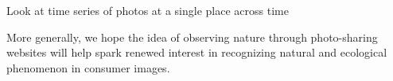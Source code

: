 Look at time series of photos at a single place across time 


More generally, we hope
the idea of observing nature through photo-sharing websites will help
spark renewed interest in recognizing natural and ecological phenomenon in
consumer images.



 






